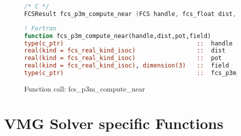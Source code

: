 \begin{figure}[htb]
\begin{lstlisting}[language=C,frame=trBL,breaklines,basicstyle=\ttfamily,prebreak={\raisebox{0ex}[0ex][0ex]{\ensuremath{\hookleftarrow}}}]
/* C */
FCSResult fcs_p3m_compute_near (FCS handle, fcs_float dist, fcs_float *pot, fcs_float *field);
\end{lstlisting}
\begin{lstlisting}[language=Fortran,frame=trBL,breaklines,basicstyle=\ttfamily,prebreak={\raisebox{0ex}[0ex][0ex]{\ensuremath{\hookleftarrow}}}]
! Fortran
function fcs_p3m_compute_near(handle,dist,pot,field)
type(c_ptr)                                     ::  handle
real(kind = fcs_real_kind_isoc)                 ::  dist
real(kind = fcs_real_kind_isoc)                 ::  pot
real(kind = fcs_real_kind_isoc), dimension(3)   ::  field
type(c_ptr)                                     ::  fcs_p3m_compute_near
\end{lstlisting}
\caption{Function call: fcs\_p3m\_compute\_near}
\label{fig:fcs_p3m_compute_near}
\end{figure}

\FloatBarrier
\section{VMG Solver specific Functions}

\FloatBarrier
